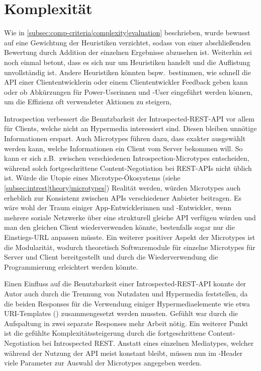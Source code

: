 \section{Komplexität}\label{sec:discussion|complexity}

Wie in \cref{subsec:comp-criteria|complexity|evaluation} beschrieben, wurde bewusst auf eine Gewichtung der Heuristiken verzichtet, sodass von einer abschließenden Bewertung durch Addition der einzelnen Ergebnisse abzusehen ist. Weiterhin sei noch einmal betont, dass es sich nur um Heuristiken handelt und die Auflistung unvollständig ist. Andere Heuristiken könnten bspw.\ bestimmen, wie schnell die API einer Cliententwicklerin oder einem Cliententwickler Feedback geben kann oder ob Abkürzungen für Power-Userinnen und -User eingeführt werden können, um die Effizienz oft verwendeter Aktionen zu steigern, 

Introspection verbessert die Benutzbarkeit der Introspected-REST-API vor allem für Clients, welche nicht an Hypermedia interessiert sind. Diesen bleiben unnötige Informationen erspart. Auch Microtypes führen dazu, dass exakter ausgewählt werden kann, welche Informationen ein Client vom Server bekommen will. So kann er sich z.B.\ zwischen verschiedenen Introspection-Microtypes entscheiden, während solch fortgeschrittene Content-Negotiation bei REST-APIs nicht üblich ist. Würde die Utopie eines Microtype-Ökosystems (siehe \cref{subsec:intrest|theory|microtypes}) Realität werden, würden Microtypes auch erheblich zur Konsistenz zwischen APIs verschiedener Anbieter beitragen. Es wäre wohl der Traum einiger App-Entwicklerinnen und -Entwickler, wenn mehrere soziale Netzwerke über eine strukturell gleiche API verfügen würden und man den gleichen Client wiederverwenden könnte, bestenfalls sogar nur die Einstiegs-URL anpassen müsste. Ein weiterer positiver Aspekt der Microtypes ist die Modularität, wodurch theoretisch Softwaremodule für einzelne Microtypes für Server und Client bereitgestellt und durch die Wiederverwendung die Programmierung erleichtert werden könnte.

Einen Einfluss auf die Benutzbarkeit einer Introspected-REST-API konnte der Autor auch durch die Trennung von Nutzdaten und Hypermedia feststellen, da die beiden Responses für die Verwendung einiger Hypermediaelemente wie etwa URI-Templates (\autocite{RFC6570}) zusammengesetzt werden mussten. Gefühlt war durch die Aufspaltung in zwei separate Responses mehr Arbeit nötig. Ein weiterer Punkt ist die gefühlte Komplexitätssteigerung durch die fortgeschrittene Content-Negotiation bei Introspected REST. Anstatt eines einzelnen Mediatypes, welcher während der Nutzung der API meist konstant bleibt, müssen nun im -Header viele Parameter zur Auswahl der Microtypes angegeben werden.

